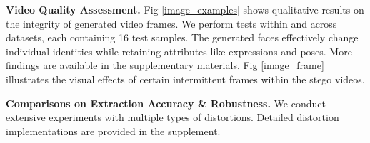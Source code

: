 \documentclass{article}
\begin{document}
\noindent\textbf{Video Quality Assessment. }Fig \ref{image_examples} shows qualitative results on the integrity of generated video frames. We perform tests within and across datasets, each containing 16 test samples. The generated faces effectively change individual identities while retaining attributes like expressions and poses. More findings are available in the supplementary materials. Fig \ref{image_frame} illustrates the visual effects of certain intermittent frames within the stego videos.

\noindent\textbf{Comparisons on Extraction Accuracy \& Robustness.}
We conduct extensive experiments with multiple types of distortions.
Detailed distortion implementations are provided in the supplement.
\begin{table}[!t]
\caption{\textbf{Ablation Study on Different Embedding Positions of Secret Message.} Evaluation metric: Accuracy.}
  \label{table_ablation_position}
\renewcommand{\arraystretch}{1.2}
\centering
\end{table}

\begin{table}[h]\small
\caption{\textbf{Ablation Study for $\lambda$ on Extraction Accuracy. }}
	\label{table_extraction}
\renewcommand{\arraystretch}{1.2}
	\begin{center}
	\end{center}
\end{table}
\end{document}
